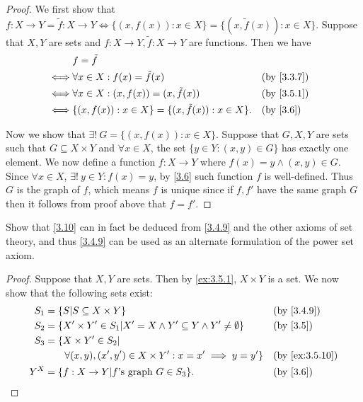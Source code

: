 \begin{proof}
  We first show that \(f : X \to Y = \tilde{f} : X \to Y \iff \{(x, f(x)) : x \in X\} = \{(x, \tilde{f}(x)) : x \in X\}\).
  Suppose that \(X, Y\) are sets and \(f : X \to Y, \tilde{f} : X \to Y\) are functions.
  Then we have
  \begin{align*}
         & f = \tilde{f}                                                                            \\
    \iff & \forall x \in X : f(x) = \tilde{f}(x)                      &  & \text{(by \cref{3.3.7})} \\
    \iff & \forall x \in X : (x, f(x)) = (x, \tilde{f}(x))            &  & \text{(by \cref{3.5.1})} \\
    \iff & \{(x, f(x)) : x \in X\} = \{(x, \tilde{f}(x)) : x \in X\}. &  & \text{(by \cref{3.6})}
  \end{align*}

  Now we show that \(\exists!\ G = \{(x, f(x)) : x \in X\}\).
  Suppose that \(G, X, Y\) are sets such that \(G \subseteq X \times Y\) and \(\forall x \in X\), the set \(\{y \in Y : (x, y) \in G\}\) has exactly one element.
  We now define a function \(f : X \to Y\) where \(f(x) = y \land (x, y) \in G\).
  Since \(\forall x \in X\), \(\exists!\ y \in Y : f(x) = y\), by \cref{3.6} such function \(f\) is well-defined.
  Thus \(G\) is the graph of \(f\), which means \(f\) is unique since if \(f, f'\) have the same graph \(G\) then it follows from proof above that \(f = f'\).
\end{proof}

\begin{ex}\label{ex:3.5.11}
  Show that \cref{3.10} can in fact be deduced from \cref{3.4.9} and the other axioms of set theory, and thus \cref{3.4.9} can be used as an alternate formulation of the power set axiom.
\end{ex}

\begin{proof}
  Suppose that \(X, Y\) are sets.
  Then by \cref{ex:3.5.1}, \(X \times Y\) is a set.
  We now show that the following sets exist:
  \begin{align*}
    S_1 & = \{S | S \subseteq X \times Y\}                                                 &  & \text{(by \cref{3.4.9})}     \\
    S_2 & = \{X' \times Y' \in S_1 | X' = X \land Y' \subseteq Y \land Y' \neq \emptyset\} &  & \text{(by \cref{3.5})}       \\
    S_3 & = \{X \times Y' \in S_2 |                                                                                          \\
        & \quad\quad \forall (x, y), (x', y') \in X \times Y' : x = x' \implies y = y'\}   &  & \text{(by \cref{ex:3.5.10})} \\
    Y^X & = \{f : X \to Y | f \text{'s graph } G \in S_3\}.                                &  & \text{(by \cref{3.6})}
  \end{align*}
\end{proof}

